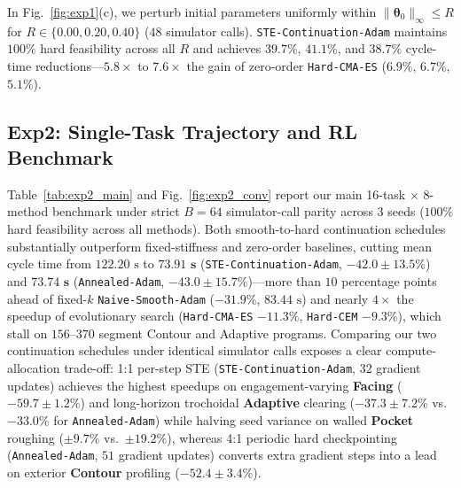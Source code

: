 \documentclass[conference]{IEEEtran}
\begin{document}
In Fig.~\ref{fig:exp1}(c), we perturb initial parameters uniformly within $\|\boldsymbol{\theta}_0\|_\infty \le R$ for $R \in \{0.00, 0.20, 0.40\}$ ($48$ simulator calls). \texttt{STE-Continuation-Adam} maintains $100\%$ hard feasibility across all $R$ and achieves $\mathbf{39.7\%}$, $\mathbf{41.1\%}$, and $\mathbf{38.7\%}$ cycle-time reductions—$5.8\times$ to $7.6\times$ the gain of zero-order \texttt{Hard-CMA-ES} ($6.9\%$, $6.7\%$, $5.1\%$).

\subsection{Exp2: Single-Task Trajectory and RL Benchmark}
Table~\ref{tab:exp2_main} and Fig.~\ref{fig:exp2_conv} report our main 16-task $\times$ 8-method benchmark under strict $B = 64$ simulator-call parity across 3 seeds ($100\%$ hard feasibility across all methods). Both smooth-to-hard continuation schedules substantially outperform fixed-stiffness and zero-order baselines, cutting mean cycle time from $122.20\text{ s}$ to $\mathbf{73.91\text{ s}}$ (\texttt{STE-Continuation-Adam}, $\mathbf{-42.0 \pm 13.5\%}$) and $\mathbf{73.74\text{ s}}$ (\texttt{Annealed-Adam}, $\mathbf{-43.0 \pm 15.7\%}$)—more than $10$ percentage points ahead of fixed-$k$ \texttt{Naive-Smooth-Adam} ($-31.9\%$, $83.44\text{ s}$) and nearly $4\times$ the speedup of evolutionary search (\texttt{Hard-CMA-ES} $-11.3\%$, \texttt{Hard-CEM} $-9.3\%$), which stall on $156$--$370$ segment Contour and Adaptive programs. Comparing our two continuation schedules under identical simulator calls exposes a clear compute-allocation trade-off: 1:1 per-step STE (\texttt{STE-Continuation-Adam}, $32$ gradient updates) achieves the highest speedups on engagement-varying \textbf{Facing} ($\mathbf{-59.7 \pm 1.2\%}$) and long-horizon trochoidal \textbf{Adaptive} clearing ($\mathbf{-37.3 \pm 7.2\%}$ vs.\ $-33.0\%$ for \texttt{Annealed-Adam}) while halving seed variance on walled \textbf{Pocket} roughing ($\pm 9.7\%$ vs.\ $\pm 19.2\%$), whereas 4:1 periodic hard checkpointing (\texttt{Annealed-Adam}, $51$ gradient updates) converts extra gradient steps into a lead on exterior \textbf{Contour} profiling ($\mathbf{-52.4 \pm 3.4\%}$).
\end{document}

